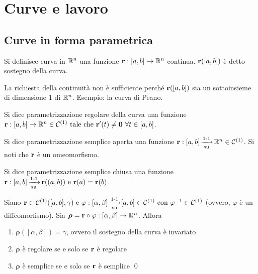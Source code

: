 \chapter{Curve e lavoro}\label{chap:curves}

\section{Curve in forma parametrica}

\begin{definition}
	[Curva]
	Si definisce curva in $\mathbb{R}^n$ una funzione $\vb{r}:[a,b]\to \mathbb{R}^n$ continua. $\vb{r}([a,b])$ è detto sostegno della curva.
\end{definition}

\begin{remark}
	La richiesta della continuità non è sufficiente perché $\vb{r}([a,b])$ sia un sottoinsieme di dimensione $1$ di $\mathbb{R}^n$. Esempio: la curva di Peano.
\end{remark}

\begin{definition}
	Si dice parametrizzazione regolare della curva una funzione $\vb{r}:[a,b]\to \mathbb{R}^n \in \mathcal{C}^{(1)} \text{ tale che } \vb{r}'(t)\neq\vb{0} \ \forall t \in [a,b]$.
\end{definition}

\begin{definition}
	Si dice parametrizzazione semplice aperta una funzione $\vb{r}: [a,b]\operatorname{\xrightarrow[\operatorname{su}]{\operatorname{1-1}}}\mathbb{R}^n \in \mathcal{C}^{(1)}$. Si noti che $\vb{r}$ è un omeomorfismo.
\end{definition}

\begin{definition}
	Si dice parametrizzazione semplice chiusa una funzione $\vb{r}: [a,b]\operatorname{\xrightarrow[\operatorname{su}]{\operatorname{1-1}}} \vb{r}((a,b)) \text{ e } \vb{r}(a)=\vb{r}(b)$.
\end{definition}

\begin{theorem}
	Siano $\vb{r} \in \mathcal{C}^{(1)}([a,b],\gamma) \text{ e } \varphi:[\alpha,\beta]\operatorname{\xrightarrow[\operatorname{su}]{\operatorname{1-1}}}[a,b]\\\in \mathcal{C}^{(1)} \text{ con } \varphi^{-1} \in \mathcal{C}^{(1)}$ (ovvero, $\varphi$ è un diffeomorfismo). Sia $\bm\rho = \vb{r} \circ \varphi: [\alpha, \beta] \to \mathbb{R}^n$. Allora
	\begin{enumerate}
		\item $\bm\rho([\alpha,\beta])=\gamma$, ovvero il sostegno della curva è invariato
		\item $\bm\rho$ è regolare se e solo se $\vb{r}$ è regolare
		\item $\bm\rho$ è semplice se e solo se $\vb{r}$ è semplice
		\qed
	\end{enumerate}
\end{theorem}

